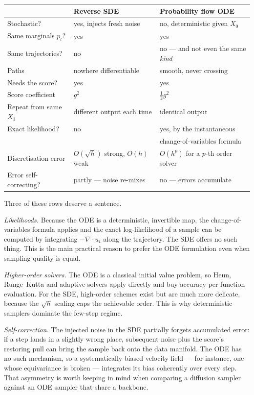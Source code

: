 \documentclass[11pt,a4paper]{report}
\theoremstyle{definition}
\theoremstyle{remark}
\begin{document}
\begin{center}
\begin{tabular}{lll}
\toprule
& Reverse SDE & Probability flow ODE \\
\midrule
Stochastic? & yes, injects fresh noise & no, deterministic given $X_0$ \\
Same marginals $p_t$? & yes & yes \\
Same trajectories? & no & no --- and not even the same \emph{kind} \\
Paths & nowhere differentiable & smooth, never crossing \\
Needs the score? & yes & yes \\
Score coefficient & $g^2$ & $\tfrac12g^2$ \\
Repeat from same $X_1$ & different output each time & identical output \\
Exact likelihood? & no & yes, by the instantaneous \\
& & change-of-variables formula \\
Discretisation error & $O(\sqrt h)$ strong, $O(h)$ weak & $O(h^p)$ for a
$p$-th order solver \\
Error self-correcting? & partly --- noise re-mixes & no --- errors accumulate \\
\bottomrule
\end{tabular}
\end{center}

Three of these rows deserve a sentence.

\emph{Likelihoods.} Because the ODE is a deterministic, invertible map, the
change-of-variables formula applies and the exact log-likelihood of a sample
can be computed by integrating $-\nabla\cdot u_t$ along the trajectory. The
SDE offers no such thing. This is the main practical reason to prefer the
ODE formulation even when sampling quality is equal.

\emph{Higher-order solvers.} The ODE is a classical initial value problem,
so Heun, Runge--Kutta and adaptive solvers apply directly and buy accuracy
per function evaluation. For the SDE, high-order schemes exist but are much
more delicate, because the $\sqrt h$ scaling caps the achievable order.
This is why deterministic samplers dominate the few-step regime.

\emph{Self-correction.} The injected noise in the SDE partially forgets
accumulated error: if a step lands in a slightly wrong place, subsequent
noise plus the score's restoring pull can bring the sample back onto the
data manifold. The ODE has no such mechanism, so a systematically biased
velocity field --- for instance, one whose equivariance is broken --- integrates
its bias coherently over every step. That asymmetry is worth keeping in mind
when comparing a diffusion sampler against an ODE sampler that share a
backbone.
\end{document}
